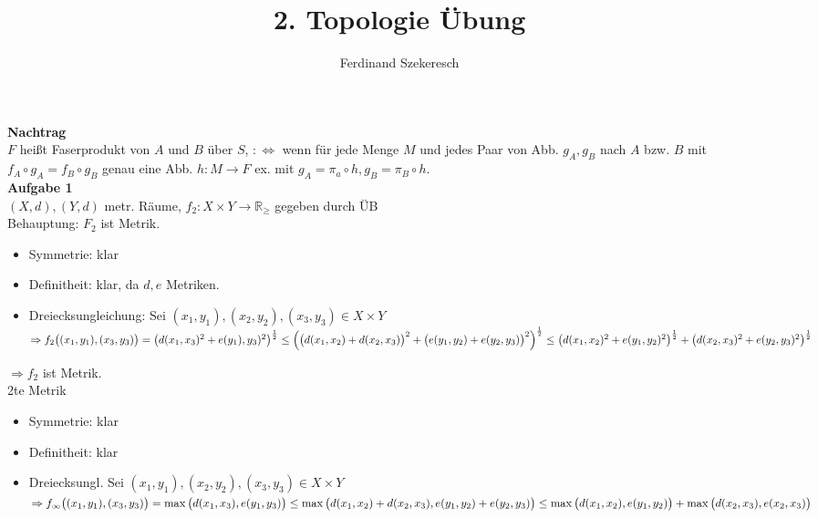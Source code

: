 \documentclass{article}
\title{2. Topologie Übung}
\author{Ferdinand Szekeresch}
\begin{document}
\maketitle

\textbf{Nachtrag}\\
$F$ heißt Faserprodukt von $A$ und $B$ über $S$, $:\Leftrightarrow$ wenn für jede Menge $M$ und jedes Paar von Abb. $g_A, g_B$ nach $A$ bzw. $B$ mit $f_A\circ g_A = f_B\circ g_B$ genau eine Abb. $h: M\rightarrow F$ ex. mit $g_A = \pi_a\circ h, g_B = \pi_B \circ h$.\\

\textbf{Aufgabe 1}\\
$(X,d),(Y,d)$ metr. Räume, $f_2: X\times Y \rightarrow \mathbb{R}_\geq$ gegeben durch ÜB\\
Behauptung: $F_2$ ist Metrik.\\
\begin{itemize}
\item Symmetrie: klar
\item Definitheit: klar, da $d,e$ Metriken.
\item Dreiecksungleichung: Sei $(x_1,y_1),(x_2,y_2),(x_3,y_3) \in X\times Y$\\
$\Rightarrow f_2\big((x_1,y_1),(x_3,y_3)\big) = \big(d(x_1,x_3)^2 + e(y_1),y_3)^2\big)^\frac12\\
\leq \Big(\big(d(x_1,x_2)+d(x_2,x_3)\big)^2 + \big(e(y_1,y_2)+e(y_2,y_3)\big)^2\Big)^\frac12\\
\leq\big(d(x_1,x_2)^2 + e(y_1,y_2)^2\big)^\frac12 + \big(d(x_2,x_3)^2 + e(y_2,y_3)^2\big)^\frac12$\\
\end{itemize}
$\Rightarrow f_2$ ist Metrik.\\
2te Metrik
\begin{itemize}
\item Symmetrie: klar
\item Definitheit: klar
\item Dreiecksungl. Sei $(x_1,y_1),(x_2,y_2),(x_3,y_3) \in X\times Y$\\
$\Rightarrow f_\infty\big((x_1,y_1),(x_3,y_3)\big) = \max\big(d(x_1,x_3),e(y_1,y_3)\big)\\
\leq \max\big(d(x_1,x_2)+d(x_2,x_3), e(y_1,y_2)+e(y_2,y_3)\big)\\
\leq \max\big(d(x_1,x_2),e(y_1,y_2)\big)+ \max\big(d(x_2,x_3),e(x_2,x_3)\big)$\\
\end{itemize}
\end{document}
